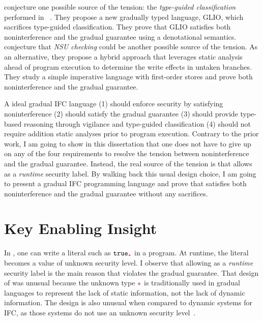 \textcite{Amorim:2020aa} conjecture one possible source of the tension: the
\textit{type-guided classification} performed in
\GSLRef~\parencite{Toro:2018aa}. They propose a new gradually typed language,
GLIO, which sacrifices type-guided classification. They prove that GLIO
satisfies both noninterference and the gradual guarantee using a denotational
semantics.
%
\textcite{bichhawat2021gradual} conjecture that \textit{NSU checking} could be
another possible source of the tension. As an alternative, they propose a hybrid
approach that leverages static analysis ahead of program execution to determine
the write effects in untaken branches. They study a simple imperative language
with first-order stores and prove both noninterference and the gradual
guarantee.

A ideal gradual IFC language (1) should enforce security by
satisfying noninterference (2) should satisfy the gradual guarantee (3) should
provide type-based reasoning through vigilance and type-guided classification
(4) should not require addition static analyses prior to program execution.
Contrary to the prior work, I am going to show in this dissertation that one
does not have to give up on any of the four requirements to resolve the tension
between noninterference and the gradual guarantee. Instead, the real source of
the tension is that \GSLRef allows \unk as a \emph{runtime} security label. By
walking back this usual design choice, I am going to present a gradual
IFC programming language \Surface and prove that \Surface satisfies
both noninterference and the gradual guarantee without any sacrifices.

\section{Key Enabling Insight}

In \GSLRef{}, one can write a literal such as $\true_{\unk}$ in a program. At
runtime, the literal becomes a value of unknown security level. I observe that
allowing \unk as a \emph{runtime} security label is the main reason that \GSLRef
violates the gradual guarantee. That design of \GSLRef was unusual because the
unknown type $\unk$ is traditionally used in gradual languages to represent the
lack of static information, not the lack of dynamic information. The design is
also unusual when compared to dynamic systems for IFC, as those systems do not
use an unknown security
level~\parencite{Askarov:2009vq,austin2009efficient,Devriese:2010up,stefan2011flexible,Austin:2017uh}.

